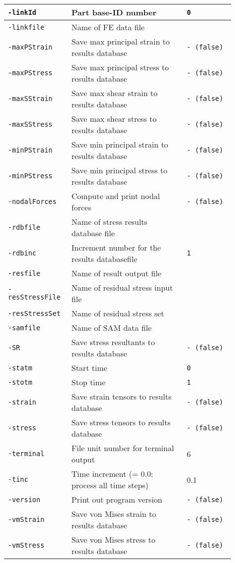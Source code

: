 {\begin{tabular}{|>{\raggedright} p{0.23\linewidth}| p{0.48\linewidth}| p{0.20\linewidth}|}
  \hline
  \texttt{-linkId} &   Part base-ID number   & \texttt{0}   \\
  \hline
  \texttt{-linkfile} &   Name of FE data file  &  \\
  \hline
  \texttt{-maxPStrain} &   Save max principal strain to results database    & \texttt{- (false)}   \\
  \hline
  \texttt{-maxPStress} &   Save max principal stress to results database    & \texttt{- (false)}   \\
  \hline
  \texttt{-maxSStrain} &   Save max shear strain to results database   & \texttt{- (false)}   \\
  \hline
  \texttt{-maxSStress} &   Save max shear stress to results database   & \texttt{- (false)}   \\
  \hline
  \texttt{-minPStrain} &   Save min principal strain to results database    & \texttt{- (false)}   \\
  \hline
  \texttt{-minPStress} &   Save min principal stress to results database    & \texttt{- (false)}   \\
  \hline
  \texttt{-nodalForces} &   Compute and print nodal forces   & \texttt{- (false)}   \\
  \hline
  \texttt{-rdbfile} &   Name of stress results database file  &  \\
  \hline
  \texttt{-rdbinc} &   Increment number for the results databasefile    & \texttt{1}   \\
  \hline
  \texttt{-resfile} &   Name of result output file  &  \\
  \hline
  \texttt{-resStressFile} &   Name of residual stress input file  &  \\
  \hline
  \texttt{-resStressSet} &   Name of residual stress set  &  \\
  \hline
  \texttt{-samfile} &   Name of SAM data file  &  \\
  \hline
  \texttt{-SR} &   Save stress resultants to results database   & \texttt{- (false)}   \\
  \hline
  \texttt{-statm} &   Start time   & \texttt{0}   \\
  \hline
  \texttt{-stotm} &   Stop time   & \texttt{1}   \\
  \hline
  \texttt{-strain} &   Save strain tensors to results database   & \texttt{- (false)}   \\
  \hline
  \texttt{-stress} &   Save stress tensors to results database   & \texttt{- (false)}   \\
  \hline
  {\tt-terminal} & File unit number for terminal output & 6 \\
  \hline
  {\tt-tinc} & Time increment (= 0.0: process all time steps) & 0.1 \\
  \hline
  {\tt-version} & Print out program version & {\tt- (false)} \\
  \hline
  {\tt-vmStrain} & Save von Mises strain to results database & {\tt- (false)} \\
  \hline
  {\tt-vmStress} & Save von Mises stress to results database & {\tt- (false)} \\
  \hline
\end{tabular}}

